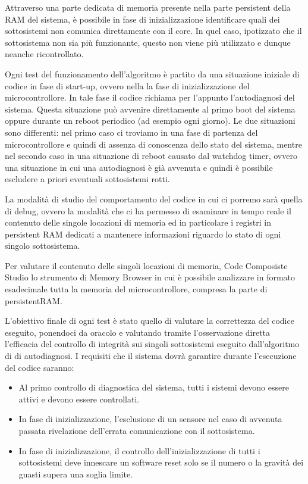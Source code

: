 \documentclass[LaM,binding=0.6cm,oneside]{../sapthesis}
\begin{document}
Attraverso una parte dedicata di memoria presente nella parte persistent della RAM del sistema, è possibile in fase di inizializzazione identificare quali dei sottosistemi non comunica direttamente con il core. In quel caso, ipotizzato che il sottosistema non sia più funzionante, questo non viene più utilizzato e dunque neanche ricontrollato.

Ogni test del funzionamento dell'algoritmo è partito da una situazione iniziale di codice in fase di start-up, ovvero nella la fase di inizializzazione del microcontrollore. In tale fase il codice richiama per l'appunto l'autodiagnosi del sistema. Questa situazione può avvenire direttamente al primo boot del sistema oppure durante un reboot periodico (ad esempio ogni giorno). Le due situazioni sono differenti: nel primo caso ci troviamo in una fase di partenza del microcontrollore e quindi di assenza di conoscenza dello stato del sistema, mentre nel secondo caso in una situazione di reboot causato dal watchdog timer, ovvero una situazione in cui una autodiagnosi è già avvenuta e quindi è possibile escludere a priori eventuali sottosistemi rotti.

La modalità di studio del comportamento del codice in cui ci porremo sarà quella di debug, ovvero la modalità che ci ha permesso di esaminare in tempo reale il contenuto delle singole locazioni di memoria ed in particolare i registri in persistent RAM dedicati a mantenere informazioni riguardo lo stato di ogni singolo sottosistema.

Per valutare il contenuto delle singoli locazioni di memoria, Code Composiste Studio lo strumento di Memory Browser in cui è possibile analizzare in formato esadecimale tutta la memoria del microcontrollore, compresa la parte di persistentRAM.

L'obiettivo finale di ogni test è stato quello di valutare la correttezza del codice eseguito, ponendoci da oracolo e valutando tramite l'osservazione diretta l'efficacia del controllo di integrità sui singoli sottosistemi eseguito dall'algoritmo di di autodiagnosi.\newline\newline
I requisiti che il sistema dovrà garantire durante l'esecuzione del codice saranno:
\begin{itemize}

    \item Al primo controllo di diagnostica del sistema, tutti i sistemi devono essere attivi e devono essere controllati.
    
    \item  In fase di inizializzazione, l'esclusione di un sensore nel caso di avvenuta passata rivelazione dell'errata comunicazione con il sottosistema.
    
    \item In fase di inizializzazione, il controllo dell'inizializzazione di tutti i sottosistemi deve innescare un software reset solo se il numero o la gravità dei guasti supera una soglia limite.
    
\end{itemize}
\end{document}
